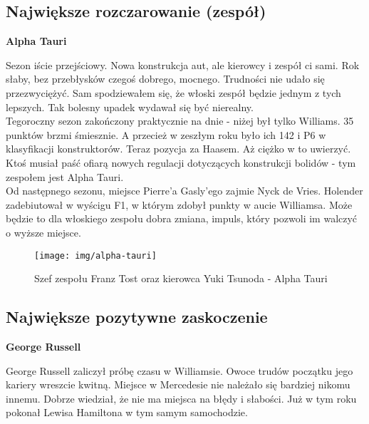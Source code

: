 \documentclass[12pt]{article}
\begin{document}
    \newpage   
    \subsection{Największe rozczarowanie (zespół)}
        \begin{center}
            \Huge \textbf{Alpha Tauri}
        \end{center}

        Sezon iście przejściowy. Nowa konstrukcja aut, ale kierowcy i zespół ci sami. Rok słaby, bez przebłysków czegoś dobrego, mocnego. Trudności nie udało się przezwyciężyć. Sam spodziewałem się, że włoski zespół będzie jednym z tych lepszych. Tak bolesny upadek wydawał się być nierealny.\\

        Tegoroczny sezon zakończony praktycznie na dnie - niżej był tylko Williams. 35 punktów brzmi śmiesznie. A przecież w zeszłym roku było ich 142 i P6 w klasyfikacji konstruktorów. Teraz pozycja za Haasem. Aż ciężko w to uwierzyć. Ktoś musiał paść ofiarą nowych regulacji dotyczących konstrukcji bolidów - tym zespołem jest Alpha Tauri.\\
        
        Od następnego sezonu, miejsce Pierre’a Gasly’ego zajmie Nyck de Vries. Holender zadebiutował w wyścigu F1, w którym zdobył punkty w aucie Williamsa. Może będzie to dla włoskiego zespołu dobra zmiana, impuls, który pozwoli im walczyć o wyższe miejsce. 

        \begin{figure}[ht]
            \centering
            \texttt{[image: img/alpha-tauri]}
            \caption{Szef zespołu Franz Tost oraz kierowca Yuki Tsunoda - Alpha Tauri}
            \label{fig:alpha}
        \end{figure}

    \newpage
    \subsection{Największe pozytywne zaskoczenie}
        \begin{center}
            \Huge \textbf{George Russell}
        \end{center}

        George Russell zaliczył próbę czasu w Williamsie. Owoce trudów początku jego kariery wreszcie kwitną. Miejsce w Mercedesie nie należało się bardziej nikomu innemu. Dobrze wiedział, że nie ma miejsca na błędy i słabości. Już w tym roku pokonał Lewisa Hamiltona w tym samym samochodzie.\\
        
\end{document}
